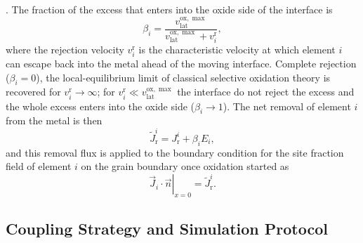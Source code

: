 \documentclass[3p,times,nonatbib]{elsarticle} %
\newcommand{\lat}{\mathrm{lat}}
\newcommand{\ox}{\mathrm{ox}}
\begin{document}
\cite{yu2018nonequilibrium,sherman2019thermodynamics}. The fraction of the excess that enters into the oxide side of the interface is
\begin{equation}
\beta_i=\frac{v_{\lat}^{\ox,\max}}{v_{\lat}^{\ox,\max}+v_i^{\mathrm{r}}} ,
\label{eq:capture-fraction}
\end{equation}
where the rejection velocity \(v_i^{\mathrm{r}}\) is the characteristic velocity at which element \(i\) can escape back into the metal ahead of the moving interface. Complete rejection (\(\beta_i=0\)), the local-equilibrium limit of classical selective oxidation theory \cite{sherman2019thermodynamics} is recovered for
\(v_i^{\mathrm{r}}\to\infty\); for \(v_i^{\mathrm{r}}\ll v_{\lat}^{\ox,\max}\)
the interface do not reject the excess and the whole excess enters into the oxide side
(\(\beta_i\to1\)). The net removal of element \(i\) from the metal is then 
\begin{equation}
\tilde{J}_{\mathrm{r}}^{i}=J_{\mathrm{r}}^{i}+\beta_i E_i,
\label{eq:sink-capture}
\end{equation}
and this removal flux is applied to the  boundary condition for the site fraction field of element \(i\) on the grain boundary once oxidation started as
\begin{equation}
\left.\vec{J}_i\!\cdot\!\vec{n}\right|_{x=0}
 = \tilde{J}_{\mathrm{r}}^{i} .
\label{eq:flux-bc}
\end{equation}


\subsection{Coupling Strategy and Simulation Protocol}
\label{sec:methodCoupling}
\end{document}

